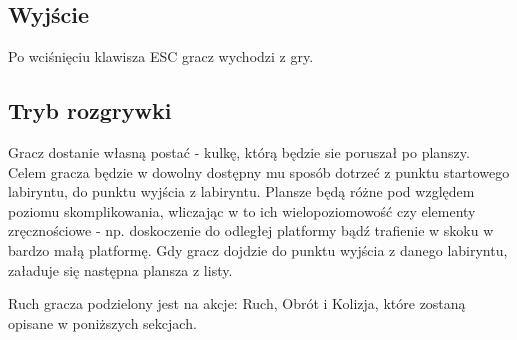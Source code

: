 \documentclass[12pt,a4paper,twoside]{article}
\begin{document}
\subsection{Wyjście}
Po wciśnięciu klawisza ESC gracz wychodzi z gry.


\subsection{Tryb rozgrywki}
Gracz dostanie własną postać - kulkę, którą będzie sie poruszał po planszy. Celem gracza będzie w dowolny dostępny mu sposób dotrzeć z punktu startowego labiryntu, do punktu wyjścia z labiryntu. Plansze będą różne pod względem poziomu skomplikowania, wliczając w to ich wielopoziomowość czy elementy zręcznościowe - np. doskoczenie do odległej platformy bądź trafienie w skoku w bardzo małą platformę. Gdy gracz dojdzie do punktu wyjścia z danego labiryntu, załaduje się następna plansza z listy.

Ruch gracza podzielony jest na akcje: Ruch, Obrót i Kolizja, które zostaną opisane w poniższych sekcjach.


\end{document}
